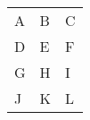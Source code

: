 \documentclass{article}
\begin{document}
\begin{tabular}{ | l | l | l | }
  \rowcolor{green}
  A & B & C \\
  \rowcolor{red}
  D & E & F \\
  G & H & I \\
  \rowcolor{blue}
  J & K & L
\end{tabular}
\end{document}
